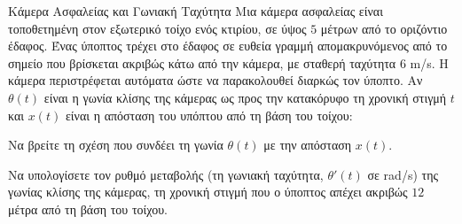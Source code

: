 \begin{problhma}{Κάμερα Ασφαλείας και Γωνιακή Ταχύτητα}
Μια κάμερα ασφαλείας είναι τοποθετημένη στον εξωτερικό τοίχο ενός κτιρίου, σε ύψος $5$ μέτρων από το οριζόντιο έδαφος. Ένας ύποπτος τρέχει στο έδαφος σε ευθεία γραμμή απομακρυνόμενος από το σημείο που βρίσκεται ακριβώς κάτω από την κάμερα, με σταθερή ταχύτητα $6$ \si{m/s}. Η κάμερα περιστρέφεται αυτόματα ώστε να παρακολουθεί διαρκώς τον ύποπτο. 
Αν $\theta(t)$ είναι η γωνία κλίσης της κάμερας ως προς την κατακόρυφο τη χρονική στιγμή $t$ και $x(t)$ είναι η απόσταση του υπόπτου από τη βάση του τοίχου:
\begin{alist}
\item Να βρείτε τη σχέση που συνδέει τη γωνία $\theta(t)$ με την απόσταση $x(t)$.
\item Να υπολογίσετε τον ρυθμό μεταβολής (τη γωνιακή ταχύτητα, $\theta'(t)$ σε \si{rad/s}) της γωνίας κλίσης της κάμερας, τη χρονική στιγμή που ο ύποπτος απέχει ακριβώς $12$ μέτρα από τη βάση του τοίχου.
\end{alist}

\begin{center}
\end{center}
\end{problhma}
